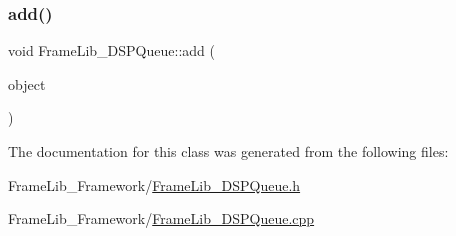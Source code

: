 \subsubsection{\texorpdfstring{add()}{add()}}
{\footnotesize\ttfamily void Frame\+Lib\+\_\+\+D\+S\+P\+Queue\+::add (\begin{DoxyParamCaption}\item[{\hyperlink{class_frame_lib___d_s_p}{Frame\+Lib\+\_\+\+D\+SP} $\ast$}]{object }\end{DoxyParamCaption})}



The documentation for this class was generated from the following files\+:\begin{DoxyCompactItemize}
\item 
Frame\+Lib\+\_\+\+Framework/\hyperlink{_frame_lib___d_s_p_queue_8h}{Frame\+Lib\+\_\+\+D\+S\+P\+Queue.\+h}\item 
Frame\+Lib\+\_\+\+Framework/\hyperlink{_frame_lib___d_s_p_queue_8cpp}{Frame\+Lib\+\_\+\+D\+S\+P\+Queue.\+cpp}\end{DoxyCompactItemize}
